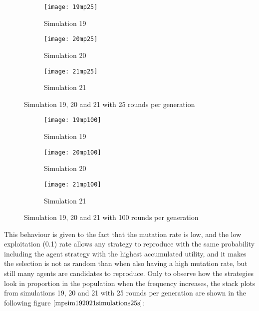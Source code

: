 \begin{figure}[H]       
    \centering
    \begin{subfigure}[b]{0.3\textwidth}
	\centering
	{\texttt{[image: 19mp25]}}   
    	\caption{Simulation 19}
	\label{fig:mpsim1925}
    \end{subfigure}
    \hfill
    \begin{subfigure}[b]{0.3\textwidth}
	\centering
	{\texttt{[image: 20mp25]}}   
    	\caption{Simulation 20}
	\label{fig:mpsim2025}
    \end{subfigure}
    \hfill
    \begin{subfigure}[b]{0.3\textwidth}
	\centering
	{\texttt{[image: 21mp25]}}   
    	\caption{Simulation 21}
	\label{fig:mpsim2125}
    \end{subfigure}
    \caption{Simulation 19, 20 and 21 with 25 rounds per generation}
    \label{mpsim192021simulations25}
\end{figure}

\begin{figure}[H]       
    \centering
    \begin{subfigure}[b]{0.3\textwidth}
	\centering
	{\texttt{[image: 19mp100]}}   
    	\caption{Simulation 19}
	\label{fig:mpsim19100}
    \end{subfigure}
    \hfill
    \begin{subfigure}[b]{0.3\textwidth}
	\centering
	{\texttt{[image: 20mp100]}}   
    	\caption{Simulation 20}
	\label{fig:mpsim20100}
    \end{subfigure}
    \hfill
    \begin{subfigure}[b]{0.3\textwidth}
	\centering
	{\texttt{[image: 21mp100]}}   
    	\caption{Simulation 21}
	\label{fig:mpsim21100}
    \end{subfigure}
    \caption{Simulation 19, 20 and 21 with 100 rounds per generation}
    \label{mpsim192021simulations100}
\end{figure}

This behaviour is given to the fact that the mutation rate is low, and the low exploitation (0.1) rate allows any  strategy to reproduce with the same probability including the agent strategy with the highest accumulated utility, and it makes the selection is not as random than when also having a high mutation rate, but still many agents are candidates to reproduce.  
Only to observe how the strategies look in proportion in the population when the frequency increases, the stack plots from simulations 19, 20 and 21 with 25 rounds per generation are shown in the following figure $\ref{mpsim192021simulations25s}$:

